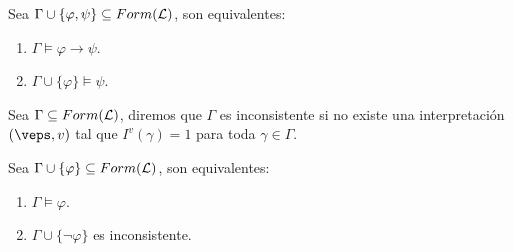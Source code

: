\begin{teo}[de la Deducción]
    Sea $\Gamma \cup \{\varphi,\psi\}\subseteq Form(\mathcal{L})$, son equivalentes:
    \begin{enumerate}
        \item $\Gamma\vDash\varphi\to\psi$.
        \item $\Gamma\cup\{\varphi\}\vDash\psi$.
    \end{enumerate}
\end{teo}

\begin{definicion}[Inconsistencia]
    Sea $\Gamma\subseteq Form(\mathcal{L})$, diremos que $\Gamma$ es inconsistente si no existe una interpretación $(\veps,v)$ tal que $I^v(\gamma)=1$ para toda $\gamma\in\Gamma$.
\end{definicion}

\begin{teo}
    Sea $\Gamma\cup \{\varphi\}\subseteq Form(\mathcal{L})$, son equivalentes:
    \begin{enumerate}
        \item $\Gamma\vDash\varphi$.
        \item $\Gamma\cup\{\neg \varphi\}$ es inconsistente.
    \end{enumerate}
\end{teo}

